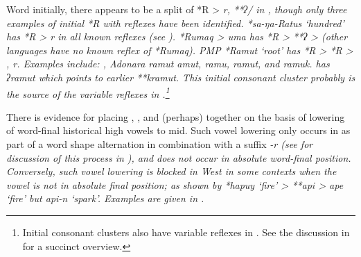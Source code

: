Word initially, there appears to be a split of *R > \it{r,} **ʔ/{\0}
in , though only three examples of initial *R with reflexes have been identified.
*sa-ŋa-Ratus ‘hundred’ has *R > \it{r} in all known reflexes (see ).
 *Rumaq > \it{uma} has *R > **ʔ > {\0} (other 
languages have no known reflex of *Rumaq).
PMP *Ramut ‘root’ has *R > *R > {\0}, \it{r}.
Examples include: ,
Adonara \it{ramut {\tl} amut},
 \it{ramu},  \it{ramut}, and  \it{ramuk}.
 has \it{ʔramut} which points to earlier **kramut.
This initial consonant cluster probably is the source of the
variable reflexes in .\footnote{
		Initial consonant clusters also have variable reflexes in .
		See the discussion in \citet[83--84]{Elias2018} for a succinct overview.}

There is evidence for placing ,
, and (perhaps)  together
on the basis of lowering of word-final historical high vowels to mid.
Such vowel lowering only occurs in  as
part of a word shape alternation in combination with a suffix
\it{-r} (see \citet[63ff]{Fricke2019} for discussion of this process
in ), and does not occur in absolute word-final position.
Conversely, such vowel lowering is blocked in West 
in some contexts when the vowel is not in absolute final position;
as shown by *hapuy ‘fire’ > **api >  \it{ape} ‘fire’ but \it{api-n} ‘spark’.
Examples are given in .

